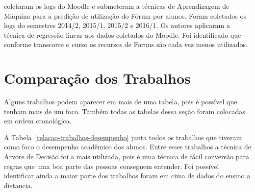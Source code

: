 \documentclass[ti]{texufpel} %
\begin{document}
\citet{de2016mineraccao} coletaram os logs do Moodle e submeteram a técnicas de Aprendizagem de Máquina para a predição de utilização do Fórum por alunos. Foram coletados os logs do semestres 2014/2, 2015/1, 2015/2 e 2016/1. Os autores aplicaram a técnica de regressão linear aos dados coletados do Moodle. Foi identificado que conforme transcorre o curso os recursos de Foruns são cada vez menos utilizados.


\section{Comparação dos Trabalhos}

Alguns trabalhos podem aparecer em mais de uma tabela, pois é possível que tenham mais de um foco. Também todas as tabelas dessa seção foram colocadas em ordem cronológica.

A Tabela~\ref{relacao-trabalhos-desempenho} junta todos os trabalhos que tiveram como foco o desempenho acadêmico dos alunos. Entre esses trabalhos a técnica de Arvore de Decisão foi a mais utilizada, pois é uma técnica de fácil conversão para regras que uma boa parte das pessoas conseguem entender. Foi possível identificar ainda a maior parte dos trabalhos foram em cima de dados do ensino a distancia.
\end{document}
